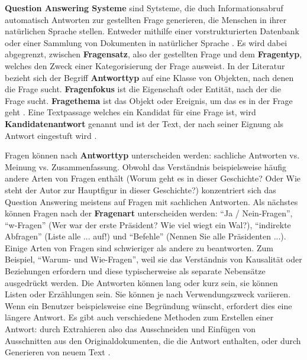 \documentclass[
        ngerman,
        paper=a4,
        numbers=noendperiod,
]{scrreprt}
\begin{document}
\textbf{Question Answering Systeme} sind Sytsteme, die duch Informationsabruf automatisch Antworten zur gestellten Frage generieren, die Menschen in ihrer natürlichen Sprache stellen. Entweder mithilfe einer vorstrukturierten Datenbank oder einer Sammlung von Dokumenten in natürlicher Sprache \citep{Chali2011ImprovingKernels}\citep{Dwivedi2013ResearchSystem}\citep{Ansari2016IntelligentNetwork}\citep{Lende2016QuestionTechniques}. Es wird dabei abgegrenzt, zwischen \textbf{Fragensatz}, also der gestellten Frage und dem \textbf{Fragentyp}, welches den Zweck einer Kategorisierung der Frage ausweist. In der Literatur bezieht sich der Begriff \textbf{Antworttyp} auf eine Klasse von Objekten, nach denen die Frage sucht. \textbf{Fragenfokus} ist die Eigenschaft oder Entität, nach der die Frage sucht. \textbf{Fragethema} ist das Objekt oder Ereignis, um das es in der Frage geht \citep[S. 2]{CalijorneSoares2018ASystems}. Eine Textpassage welches ein Kandidat für eine Frage ist, wird \textbf{Kandidatenantwort} genannt und ist der Text, der nach seiner Eignung als Antwort eingestuft wird \citep{RetrievalOpen-DomainQuestion-Answering}.

Fragen können nach \textbf{Antworttyp} unterscheiden werden: sachliche Antworten vs. Meinung vs. Zusammenfassung. Obwohl das Verständnis beispielsweise häufig andere Arten von Fragen enthält (Worum geht es in dieser Geschichte? Oder Wie steht der Autor zur Hauptfigur in dieser Geschichte?) konzentriert sich das Question Answering meistens auf Fragen mit sachlichen Antworten. Als nächstes können Fragen nach der \textbf{Fragenart} unterscheiden werden: \enquote{Ja / Nein-Fragen}, \enquote{w-Fragen} (Wer war der erste Präsident? Wie viel wiegt ein Wal?), \enquote{indirekte Abfragen} (Liste alle ... auf!) und \enquote{Befehle} (Nennen Sie alle Präsidenten ...). Einige Arten von Fragen sind schwieriger als andere zu beantworten. Zum Beispiel, \enquote{Warum- und Wie-Fragen}, weil sie das Verständnis von Kausalität oder Beziehungen erfordern und diese typischerweise als separate Nebensätze ausgedrückt werden. Die Antworten können lang oder kurz sein, sie können Listen oder Erzählungen sein. Sie können je nach Verwendungszweck variieren. Wenn ein Benutzer beispielsweise eine Begründung wünscht, erfordert dies eine längere Antwort. Es gibt auch verschiedene Methoden zum Erstellen einer Antwort: durch Extrahieren also das Ausschneiden und Einfügen von Ausschnitten aus den Originaldokumenten, die die Antwort enthalten, oder durch Generieren von neuem Text \citep [S. 277-278]{Hirschman2001NaturalHere}. 
\end{document}

